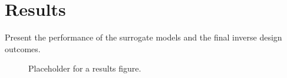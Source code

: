 \chapter{Results}
\label{sec:results}

Present the performance of the surrogate models and the final inverse design outcomes.

\begin{figure}[htbp]
    \centering
    \caption{Placeholder for a results figure.}
    \label{fig:results_placeholder}
\end{figure}
